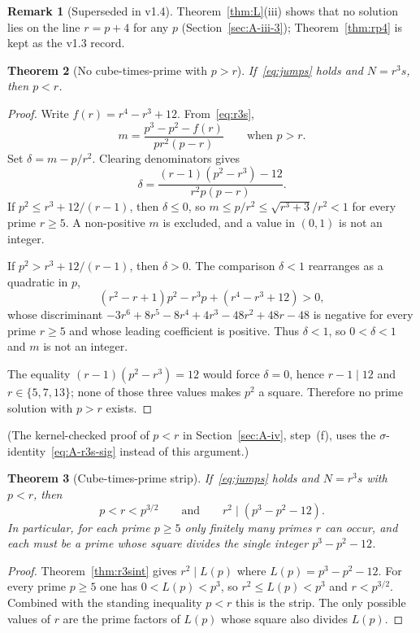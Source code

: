 \documentclass[11pt,reqno]{amsart}
\newcommand{\sig}{\sigma}
\newtheorem{theorem}{Theorem}
\theoremstyle{definition}
\newtheorem{remark}[theorem]{Remark}
\begin{document}
\begin{remark}[Superseded in v1.4]
Theorem~\ref{thm:L}(iii) shows that no solution lies on the line \(r=p+4\) for any \(p\) (Section~\ref{sec:A-iii-3}); Theorem~\ref{thm:rp4} is kept as the v1.3 record.
\end{remark}

\begin{theorem}[No cube-times-prime with \(p>r\)]
\label{thm:r3s-plarge}
If~\eqref{eq:jumps} holds and \(N=r^3s\), then \(p<r\).
\end{theorem}

\begin{proof}
Write \(f(r)=r^4-r^3+12\). From~\eqref{eq:r3s},
\[
m=\frac{p^3-p^2-f(r)}{pr^2(p-r)}\qquad\text{when \(p>r\)}.
\]
Set \(\delta=m-p/r^2\). Clearing denominators gives
\[
\delta=\frac{(r-1)(p^2-r^3)-12}{r^2p(p-r)}.
\]
If \(p^2\le r^3+12/(r-1)\), then \(\delta\le 0\), so \(m\le p/r^2\le\sqrt{r^3+3}/r^2<1\) for every prime \(r\ge 5\). A non-positive \(m\) is excluded, and a value in \((0,1)\) is not an integer.

If \(p^2>r^3+12/(r-1)\), then \(\delta>0\). The comparison \(\delta<1\) rearranges as a quadratic in \(p\),
\[
(r^2-r+1)p^2-r^3p+(r^4-r^3+12)>0,
\]
whose discriminant \(-3r^6+8r^5-8r^4+4r^3-48r^2+48r-48\) is negative for every prime \(r\ge 5\) and whose leading coefficient is positive. Thus \(\delta<1\), so \(0<\delta<1\) and \(m\) is not an integer.

The equality \((r-1)(p^2-r^3)=12\) would force \(\delta=0\), hence \(r-1\mid 12\) and \(r\in\{5,7,13\}\); none of those three values makes \(p^2\) a square. Therefore no prime solution with \(p>r\) exists.
\end{proof}

\noindent(The kernel-checked proof of \(p<r\) in Section~\ref{sec:A-iv}, step~(f), uses the \(\sig\)-identity~\eqref{eq:A-r3s-sig} instead of this argument.)

\begin{theorem}[Cube-times-prime strip]
\label{thm:r3s-strip}
If~\eqref{eq:jumps} holds and \(N=r^3s\) with \(p<r\), then
\[
p<r<p^{3/2}\qquad\text{and}\qquad r^2\mid(p^3-p^2-12).
\]
In particular, for each prime \(p\ge 5\) only finitely many primes \(r\) can occur, and each must be a prime whose square divides the single integer \(p^3-p^2-12\).
\end{theorem}

\begin{proof}
Theorem~\ref{thm:r3sint} gives \(r^2\mid L(p)\) where \(L(p)=p^3-p^2-12\). For every prime \(p\ge 5\) one has \(0<L(p)<p^3\), so \(r^2\le L(p)<p^3\) and \(r<p^{3/2}\). Combined with the standing inequality \(p<r\) this is the strip. The only possible values of \(r\) are the prime factors of \(L(p)\) whose square also divides \(L(p)\).
\end{proof}
\end{document}
